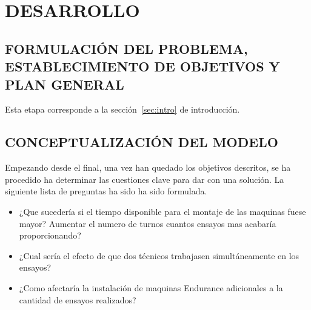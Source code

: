 
\section{DESARROLLO}

\subsection{FORMULACIÓN DEL PROBLEMA, \newline ESTABLECIMIENTO DE OBJETIVOS Y PLAN \newline GENERAL}

Esta etapa corresponde a la sección~\ref{sec:intro} de introducción.

\subsection{CONCEPTUALIZACIÓN DEL MODELO}

Empezando desde el final,
una vez han quedado los objetivos descritos,
se ha procedido ha determinar las cuestiones clave para dar con una solución.
La siguiente lista de preguntas ha sido ha sido formulada.

\begin{itemize}
	\item ¿Que sucedería si el tiempo disponible para el montaje de las maquinas fuese mayor? Aumentar el numero de turnos cuantos ensayos mas acabaría proporcionando?
	\item ¿Cual sería el efecto de que dos técnicos trabajasen simultáneamente en los ensayos?
	\item ¿Como afectaría la instalación de maquinas Endurance
		adicionales a la cantidad de ensayos realizados?
\end{itemize}

